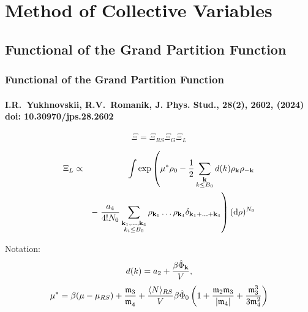 \documentclass[8pt]{beamer}
\begin{document}
	\section{Method of Collective Variables}
	\subsection{Functional of the Grand Partition Function}
	
	\begin{frame}
		\frametitle{Functional of the Grand Partition Function}
		\framesubtitle{I.R.~Yukhnovskii, R.V.~Romanik, J. Phys. Stud., {\bf 28}(2), 2602, (2024)
			doi: 10.30970/jps.28.2602}
		
		\begin{equation*}
			\label{Xi_as_prod}
			\Xi = \Xi_{RS}\Xi_G\Xi_L
		\end{equation*}
		
		\begin{eqnarray*}
			\label{Xi_L_1}
			\Xi_L & \propto &
			\int \exp\left(
			\mu^* \rho_0 - \frac{1}{2} \sum_{\substack{\vb k \\ k \leq B_0}} d(k) \rho_{\vb k} \rho_{-\vb k} 
			\right.\\
			&& -\left. \frac{a_4}{4! N_0} \sum_{\substack{\vb k_1, \dotsc, \vb k_4 \\ k_i \leq B_0}} \rho_{\vb k_1} \dotsc \rho_{\vb k_4} \delta_{\vb{k}_1 + \dotsc + \vb{k}_4} \right) ({\rm d} \rho)^{N_0}
			\nonumber
		\end{eqnarray*}
		
		Notation:
		\begin{equation*}
			d(k) = a_2 + \frac{\beta\hat{\Phi}_{\vb k}}{V},
		\end{equation*}
		\begin{equation*}
			\mu^* = \beta(\mu - \mu_{RS}) + \frac{\mathfrak{m}_3}{\mathfrak{m_4}} + 
			\frac{\langle N \rangle_{RS}}{V}\beta\hat{\Phi}_0 
			\left(
			1 + \frac{\mathfrak{m}_2 \mathfrak{m}_3}{\abs{\mathfrak{m}_4}} + \frac{\mathfrak{m}_3^3}{3\mathfrak{m}_4^2}
			\right)
		\end{equation*}
		
	\end{frame}
	
\end{document}
